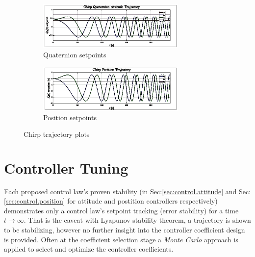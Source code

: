 \begin{figure}[htbp]
\vspace{-6pt}
\centering
\begin{subfigure}{\textwidth}
\centering
\includegraphics[width=0.8\textwidth]{graphs/Attitude_Trajectory}
\vspace{-6pt}
\caption{Quaternion setpoints}
\label{fig:Attitude_Trajectory}
\end{subfigure}
\begin{subfigure}{\textwidth}
\centering
\includegraphics[width=0.8\textwidth]{graphs/Position_Trajectory}
\vspace{-6pt}
\caption{Position setpoints}
\label{fig:Position_Trajectory}
\end{subfigure}
\vspace{-8pt}
\caption{Chirp trajectory plots}
\label{fig:Trajectory_Plot}
\vspace{-12pt}
\end{figure}
\section{Controller Tuning}
\label{sec:simulation.tuning}
Each proposed control law's proven stability (in Sec:\ref{sec:control.attitude} and Sec:\ref{sec:control.position} for attitude and postition controllers respectively) demonstrates only a control law's setpoint tracking (error stability) for a time $t\rightarrow\infty$. That is the caveat with Lyapunov stability theorem, a trajectory is shown to be stabilizing, however no further insight into the controller coefficient design is provided. Often at the coefficient selection stage a \emph{Monte Carlo} approach is applied to select and optimize the controller coefficients.
